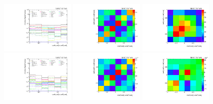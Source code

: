 \begin{refsection}
\begin{figure}[htb]
\begin{center}
 \includegraphics[width=0.32\textwidth]{fig_fullRun2UL/unfolding/combined/deltaSystCombinedlog_rebinnedB_c_Prk.pdf}
 \includegraphics[width=0.32\textwidth]{fig_fullRun2UL/unfolding/combined/StatCovMatrix_rebinnedB_c_Prk.pdf}
 \includegraphics[width=0.32\textwidth]{fig_fullRun2UL/unfolding/combined/TotalSystCovMatrix_rebinnedB_c_Prk.pdf} \\
 \includegraphics[width=0.32\textwidth]{fig_fullRun2UL/unfolding/combined/deltaSystCombinedlogNorm_rebinnedB_c_Prk.pdf}
 \includegraphics[width=0.32\textwidth]{fig_fullRun2UL/unfolding/combined/StatCovMatrixNorm_rebinnedB_c_Prk.pdf}
 \includegraphics[width=0.32\textwidth]{fig_fullRun2UL/unfolding/combined/TotalSystCovMatrixNorm_rebinnedB_c_Prk.pdf} \\

\end{center}
\end{figure}
\end{refsection}
